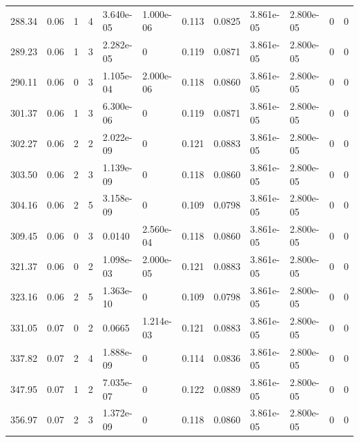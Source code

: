 \documentclass[preview]{standalone}
\begin{document}
{{{\begin{tabular}{L{1.2cm}C{1.2cm} C{0.3cm}C{0.5cm} C{1.4cm}C{1.4cm} C{1.4cm}C{1.4cm} C{1.6cm}C{1.6cm} C{1.6cm}C{1.6cm}}
  288.34  &  0.06  & 1     &  4 &  3.640e-05  & 1.000e-06  &  0.113&   0.0825& 3.861e-05 & 2.800e-05   &  0 & 0  \\ 
  289.23  &  0.06  & 1     &  3 &  2.282e-05  & 0  &  0.119&   0.0871& 3.861e-05 & 2.800e-05   &  0 & 0  \\ 
  290.11  &  0.06  & 0     &  3 &  1.105e-04  & 2.000e-06  &  0.118&   0.0860& 3.861e-05 & 2.800e-05   &  0 & 0  \\ 
  301.37  &  0.06  & 1     &  3 &  6.300e-06  & 0  &  0.119&   0.0871& 3.861e-05 & 2.800e-05   &  0 & 0  \\ 
  302.27  &  0.06  & 2     &  2 &  2.022e-09  & 0  &  0.121&   0.0883& 3.861e-05 & 2.800e-05   &  0 & 0  \\ 
  303.50  &  0.06  & 2     &  3 &  1.139e-09  & 0  &  0.118&   0.0860& 3.861e-05 & 2.800e-05   &  0 & 0  \\ 
  304.16  &  0.06  & 2     &  5 &  3.158e-09  & 0  &  0.109&   0.0798& 3.861e-05 & 2.800e-05   &  0 & 0  \\ 
  309.45  &  0.06  & 0     &  3 &  0.0140  & 2.560e-04  &  0.118&   0.0860& 3.861e-05 & 2.800e-05   &  0 & 0  \\ 
  321.37  &  0.06  & 0     &  2 &  1.098e-03  & 2.000e-05  &  0.121&   0.0883& 3.861e-05 & 2.800e-05   &  0 & 0  \\ 
  323.16  &  0.06  & 2     &  5 &  1.363e-10  & 0  &  0.109&   0.0798& 3.861e-05 & 2.800e-05   &  0 & 0  \\ 
  331.05  &  0.07  & 0     &  2 &  0.0665  & 1.214e-03  &  0.121&   0.0883& 3.861e-05 & 2.800e-05   &  0 & 0  \\ 
  337.82  &  0.07  & 2     &  4 &  1.888e-09  & 0  &  0.114&   0.0836& 3.861e-05 & 2.800e-05   &  0 & 0  \\ 
  347.95  &  0.07  & 1     &  2 &  7.035e-07  & 0  &  0.122&   0.0889& 3.861e-05 & 2.800e-05   &  0 & 0  \\ 
  356.97  &  0.07  & 2     &  3 &  1.372e-09  & 0  &  0.118&   0.0860& 3.861e-05 & 2.800e-05   &  0 & 0  \\ 
\hline 
\end{tabular} 

}}}
\end{document}
